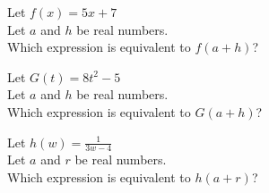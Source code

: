\documentclass{ximera}
\author{Lee Wayand}
\begin{document}
\begin{exercise}




\begin{question}
Let $f(x) = 5 x + 7$ \\

Let $a$ and $h$ be real numbers. \\

Which expression is equivalent to $f(a+h)$?


\begin{multipleChoice}
\end{multipleChoice}

\end{question}










\begin{question}
Let $G(t) = 8t^2 - 5$ \\

Let $a$ and $h$ be real numbers. \\

Which expression is equivalent to $G(a+h)$?


\begin{multipleChoice}
\end{multipleChoice}

\end{question}










\begin{question}
Let $h(w) = \frac{1}{3w-4}$ \\

Let $a$ and $r$ be real numbers. \\

Which expression is equivalent to $h(a+r)$?


\begin{multipleChoice}
\end{multipleChoice}

\end{question}













\end{exercise}
\end{document}
